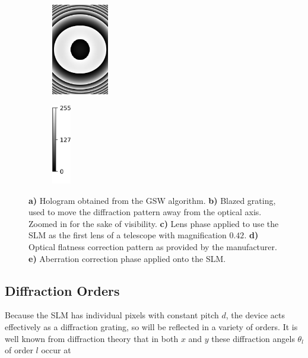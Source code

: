 \begin{figure}
\begin{subfigure}{.18\linewidth}
		\caption{}
		\label{fig:Flatness}
	\end{subfigure}
	\begin{subfigure}{.18\linewidth}
		\centering
		\includegraphics[height=4cm]{figures/SLMphase/zernike.jpg}
		\caption{}
		\label{fig:Zernike}
	\end{subfigure}
	\begin{subfigure}{0.055\linewidth}
	    \centering
	    \includegraphics[height = 3.5cm]{figures/SLMphase/colorbar.jpg}
	\end{subfigure}
	\caption{
	\textbf{a)} Hologram obtained from the \ac{GSW} algorithm.
	\textbf{b)} Blazed grating, used to move the diffraction pattern away from the optical axis. Zoomed in for the sake of visibility.
	\textbf{c)} Lens phase applied to use the SLM as the first lens of a telescope with magnification $0.42$.
	\textbf{d)} Optical flatness correction pattern as provided by the manufacturer.
	\textbf{e)} Aberration correction phase applied onto the SLM.
	}
	\label{fig:SLMphase}
\end{figure}


\subsection{Diffraction Orders}\label{subsec:Diffraction}

Because the SLM has individual pixels with constant pitch $d$, the device acts effectively as a diffraction grating, so will be reflected in a variety of orders. 
It is well known from diffraction theory that in both $x$ and $y$ these diffraction angels $\theta_l$ of order $l$ occur at \cite{Hecht2002}

